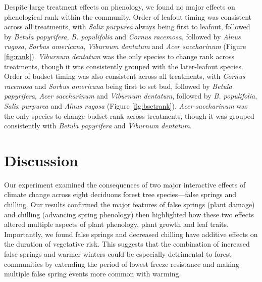 \documentclass{article}\usepackage[]{graphicx}\usepackage[]{color}
\begin{document}
Despite large treatment effects on phenology, we found no major effects on phenological rank within the community. Order of leafout timing was consistent across all treatments, with \textit{Salix purpurea} always being first to leafout, followed by \textit{Betula papyrifera}, \textit{B. populifolia} and \textit{Cornus racemosa}, followed by \textit{Alnus rugosa}, \textit{Sorbus americana}, \textit{Viburnum dentatum} and \textit{Acer saccharinum} (Figure \ref{fig:rank}). \textit{Viburnum dentatum} was the only species to change rank across treatments, though it was consistently grouped with the later-leafout  species. Order of budset timing was also consistent across all treatments, with \textit{Cornus racemosa} and \textit{Sorbus americana} being first to set bud, followed by \textit{Betula papyrifera}, \textit{Acer saccharinum} and \textit{Viburnum dentatum}, followed by \textit{B. populifolia}, \textit{Salix purpurea} and \textit{Alnus rugosa} (Figure \ref{fig:bsetrank}). \textit{Acer saccharinum} was the only species to change budset rank across treatments, though it was grouped consistently with \textit{Betula papyrifera} and \textit{Viburnum dentatum}.

\section*{Discussion} 
Our experiment examined the consequences of two major interactive effects of climate change across eight deciduous forest tree species---false springs and chilling. Our results confirmed the major features of false springs (plant damage) and chilling (advancing spring phenology) then highlighted how these two effects altered multiple aspects of plant phenology, plant growth and leaf traits. Importantly, we found false springs and decreased chilling have additive effects on the duration of vegetative risk. This suggests that the combination of increased false springs and warmer winters could be especially detrimental to forest communities by extending the period of lowest freeze resistance and making multiple false spring events more common with warming. 
\end{document}
